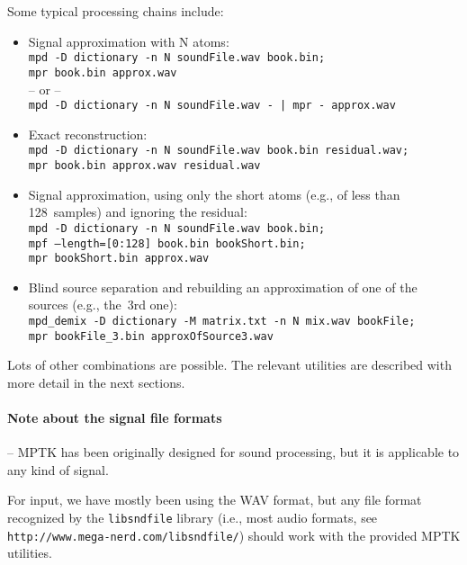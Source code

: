 \documentclass[11pt,a4paper]{article}
\begin{document}
\smallskip

Some typical processing chains include:
\begin{itemize}
\item Signal approximation with N atoms: \\
      \mbox{\tt mpd -D dictionary -n N soundFile.wav book.bin;} \\
      \mbox{\tt mpr book.bin approx.wav} \\
      -- or -- \\
      \mbox{\tt mpd -D dictionary -n N soundFile.wav - | mpr - approx.wav}
\item Exact reconstruction: \\
      \mbox{\tt mpd -D dictionary -n N soundFile.wav book.bin residual.wav;} \\
      \mbox{\tt mpr book.bin approx.wav residual.wav}
\item Signal approximation, using only the short atoms (e.g., of less than
128~samples) \linebreak and ignoring the residual: \\
      \mbox{\tt mpd -D dictionary -n N soundFile.wav book.bin;} \\
      \mbox{\tt mpf --length=[0:128] book.bin bookShort.bin;} \\
      \mbox{\tt mpr bookShort.bin approx.wav}
\item Blind source separation and rebuilding an approximation of one of the
  sources (e.g., the~3rd one): \\
      \mbox{\tt mpd\_demix -D dictionary -M matrix.txt -n N mix.wav bookFile;} \\
      \mbox{\tt mpr bookFile\_3.bin approxOfSource3.wav}
\end{itemize}
Lots of other combinations are possible. The relevant utilities are described
with more detail in the next sections.

\paragraph{Note about the signal file formats} -- MPTK has been originally designed for sound
processing, but it is applicable to any kind of signal.

For input, we have mostly been using the WAV format, but any file format
recognized by the \verb+libsndfile+ library (i.e., most audio formats, see
\verb+http://www.mega-nerd.com/libsndfile/+) should work with the provided MPTK
utilities.
\end{document}
